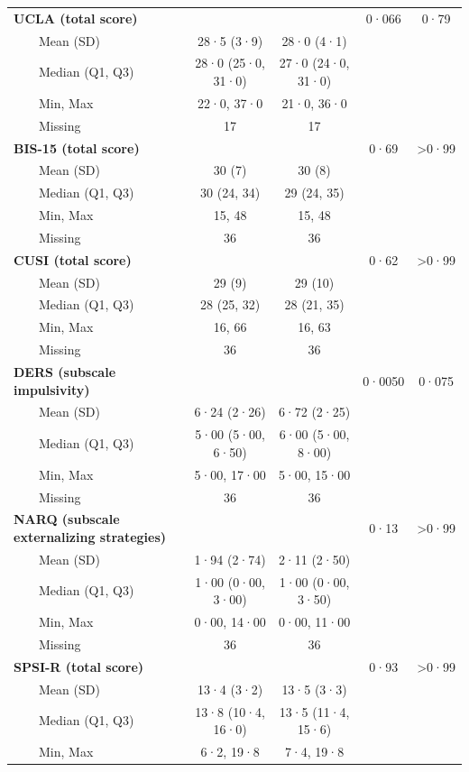 \documentclass[
  super,
  preprint,
  1p,
  onecolumn]{elsarticle}
\begin{document}
\begin{table}
{\begin{tabular*}{\linewidth}{@{\extracolsep{\fill}}lcccc}
{\bfseries UCLA (total score)} &  &  & 0·066 & 0·79 \\ 
    Mean (SD) & 28·5 (3·9) & 28·0 (4·1) &  &  \\ 
    Median (Q1, Q3) & 28·0 (25·0, 31·0) & 27·0 (24·0, 31·0) &  &  \\ 
    Min, Max & 22·0, 37·0 & 21·0, 36·0 &  &  \\ 
    Missing & 17 & 17 &  &  \\ 
{\bfseries BIS-15 (total score)} &  &  & 0·69 & >0·99 \\ 
    Mean (SD) & 30 (7) & 30 (8) &  &  \\ 
    Median (Q1, Q3) & 30 (24, 34) & 29 (24, 35) &  &  \\ 
    Min, Max & 15, 48 & 15, 48 &  &  \\ 
    Missing & 36 & 36 &  &  \\ 
{\bfseries CUSI (total score)} &  &  & 0·62 & >0·99 \\ 
    Mean (SD) & 29 (9) & 29 (10) &  &  \\ 
    Median (Q1, Q3) & 28 (25, 32) & 28 (21, 35) &  &  \\ 
    Min, Max & 16, 66 & 16, 63 &  &  \\ 
    Missing & 36 & 36 &  &  \\ 
{\bfseries DERS (subscale impulsivity)} &  &  & 0·0050 & 0·075 \\ 
    Mean (SD) & 6·24 (2·26) & 6·72 (2·25) &  &  \\ 
    Median (Q1, Q3) & 5·00 (5·00, 6·50) & 6·00 (5·00, 8·00) &  &  \\ 
    Min, Max & 5·00, 17·00 & 5·00, 15·00 &  &  \\ 
    Missing & 36 & 36 &  &  \\ 
{\bfseries NARQ (subscale externalizing strategies)} &  &  & 0·13 & >0·99 \\ 
    Mean (SD) & 1·94 (2·74) & 2·11 (2·50) &  &  \\ 
    Median (Q1, Q3) & 1·00 (0·00, 3·00) & 1·00 (0·00, 3·50) &  &  \\ 
    Min, Max & 0·00, 14·00 & 0·00, 11·00 &  &  \\ 
    Missing & 36 & 36 &  &  \\ 
{\bfseries SPSI-R (total score)} &  &  & 0·93 & >0·99 \\ 
    Mean (SD) & 13·4 (3·2) & 13·5 (3·3) &  &  \\ 
    Median (Q1, Q3) & 13·8 (10·4, 16·0) & 13·5 (11·4, 15·6) &  &  \\ 
    Min, Max & 6·2, 19·8 & 7·4, 19·8 &  &  \\ 

\end{tabular*}}
\end{table}
\end{document}
